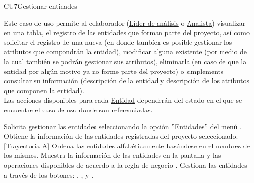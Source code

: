 	\begin{UseCase}{CU7}{Gestionar entidades}{
			
		Este caso de uso permite al colaborador (\hyperlink{jefe}{Líder de análisis} o \hyperlink{analista}{Analista}) visualizar en una tabla, el registro de las entidades que forman parte del proyecto, así como solicitar el registro de una nueva (en donde tambíen es posible gestionar los atributos que compondrán la entidad), modificar alguna existente (por medio de la cual también se podrán gestionar sus atributos), eliminarla (en caso de que la entidad por algún motivo ya no forme parte del proyecto) o simplemente consultar su información (descripción de la entidad y descripción de los atributos que componen la entidad). \\
     	Las acciones disponibles para cada \hyperlink{entidadEntidad}{Entidad} dependerán del estado en el que se encuentre el caso de uso donde son referenciadas. 
	}
	
\end{UseCase}
\begin{UCtrayectoria}
	\UCpaso[\UCactor] Solicita gestionar las entidades seleccionando la opción ''Entidades'' del menú .
	\UCpaso[\UCsist] Obtiene la información de las entidades registradas del proyecto seleccionado. \hyperlink{CU7:TAA}{[Trayectoria A]}
	\UCpaso[\UCsist] Ordena las entidades alfabéticamente basándose en el nombres de los mismos.
	\UCpaso[\UCsist] Muestra la información de las entidades en la pantalla  y las operaciones disponibles de acuerdo a la regla de negocio . \label{CU7-P4}
	\UCpaso[\UCactor] Gestiona las entidades a través de los botones: , \editar , \eliminar y . 
\end{UCtrayectoria}		

